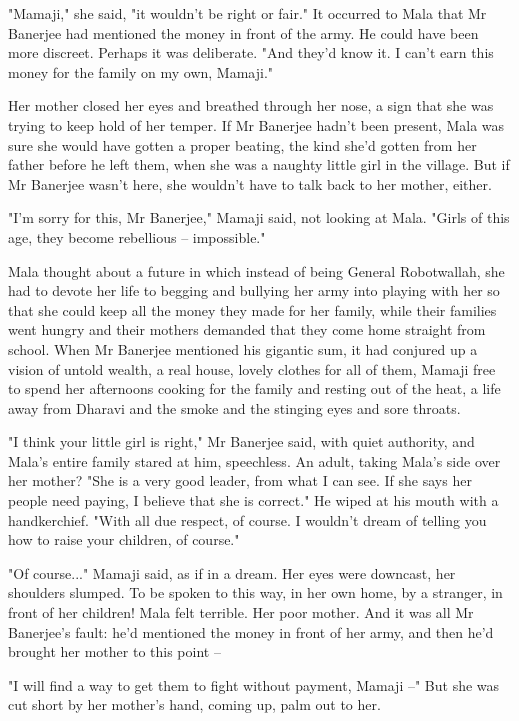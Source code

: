 "Mamaji," she said, "it wouldn't be right or fair." It occurred to
Mala that Mr Banerjee had mentioned the money in front of the army.
He could have been more discreet. Perhaps it was deliberate. "And
they'd know it. I can't earn this money for the family on my own,
Mamaji."

Her mother closed her eyes and breathed through her nose, a sign
that she was trying to keep hold of her temper. If Mr Banerjee
hadn't been present, Mala was sure she would have gotten a proper
beating, the kind she'd gotten from her father before he left them,
when she was a naughty little girl in the village. But if Mr
Banerjee wasn't here, she wouldn't have to talk back to her mother,
either.

"I'm sorry for this, Mr Banerjee," Mamaji said, not looking at
Mala. "Girls of this age, they become rebellious -- impossible."

Mala thought about a future in which instead of being General
Robotwallah, she had to devote her life to begging and bullying her
army into playing with her so that she could keep all the money
they made for her family, while their families went hungry and
their mothers demanded that they come home straight from school.
When Mr Banerjee mentioned his gigantic sum, it had conjured up a
vision of untold wealth, a real house, lovely clothes for all of
them, Mamaji free to spend her afternoons cooking for the family
and resting out of the heat, a life away from Dharavi and the smoke
and the stinging eyes and sore throats.

"I think your little girl is right," Mr Banerjee said, with quiet
authority, and Mala's entire family stared at him, speechless. An
adult, taking Mala's side over her mother? "She is a very good
leader, from what I can see. If she says her people need paying, I
believe that she is correct." He wiped at his mouth with a
handkerchief. "With all due respect, of course. I wouldn't dream of
telling you how to raise your children, of course."

"Of course..." Mamaji said, as if in a dream. Her eyes were
downcast, her shoulders slumped. To be spoken to this way, in her
own home, by a stranger, in front of her children! Mala felt
terrible. Her poor mother. And it was all Mr Banerjee's fault: he'd
mentioned the money in front of her army, and then he'd brought her
mother to this point --

"I will find a way to get them to fight without payment, Mamaji --"
But she was cut short by her mother's hand, coming up, palm out to
her.


